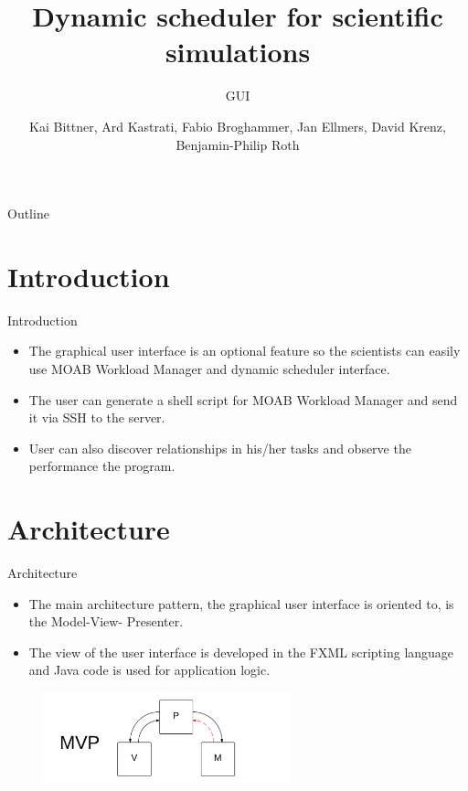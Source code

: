 \documentclass[18pt]{beamer}
\title[GUI]{Dynamic scheduler for scientific simulations}
\subtitle{GUI}
\author{Kai Bittner, Ard Kastrati, Fabio Broghammer, Jan Ellmers, David Krenz, Benjamin-Philip Roth}
\institute{Steinbuch Centre for Computing (SCC)}
\begin{document}

\begin{frame}
\titlepage
\end{frame}

\begin{frame}{Outline}
\tableofcontents
\end{frame}

\section{Introduction}
	\begin{frame}{Introduction}
		\begin{itemize}
			\pause
			\item The graphical user interface is an optional feature so the scientists can easily use MOAB Workload Manager and dynamic scheduler interface. 
			\pause
			\item The user can generate a shell script for MOAB Workload Manager and send it via SSH to the server.
			\pause
			\item User can also discover relationships in his/her tasks and observe the performance the program. 
			
		\end{itemize}
	\end{frame}
	
\section{Architecture}
	\begin{frame}{Architecture}
		\begin{itemize}
			\item The main architecture pattern, the graphical user interface is oriented to, is the Model-View-
Presenter. 
	        \item The view of the user interface is developed in the FXML scripting language and Java code is used for application logic.
	        
				\includegraphics[width=300px, height=100px]{images/mvp.png}
		\end{itemize}
	\end{frame}
	
\end{document}
